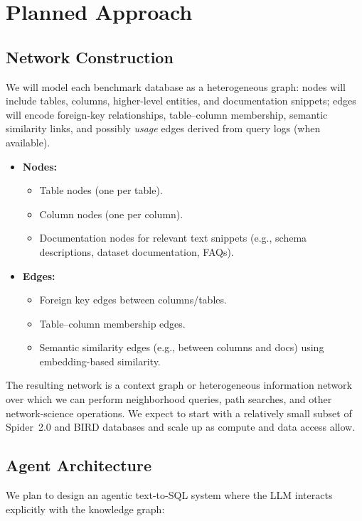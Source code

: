 \documentclass[11pt]{article}
\begin{document}
\section{Planned Approach}

\subsection{Network Construction}

We will model each benchmark database as a heterogeneous graph:
nodes will include tables, columns, higher-level entities, and documentation snippets;
edges will encode foreign-key relationships, table--column membership, semantic similarity links, and possibly \emph{usage} edges derived from query logs (when available).

\begin{itemize}[leftmargin=*]
  \item \textbf{Nodes:}
  \begin{itemize}
    \item Table nodes (one per table).
    \item Column nodes (one per column).
    \item Documentation nodes for relevant text snippets (e.g., schema descriptions, dataset documentation, FAQs).
  \end{itemize}
  \item \textbf{Edges:}
  \begin{itemize}
    \item Foreign key edges between columns/tables.
    \item Table--column membership edges.
    \item Semantic similarity edges (e.g., between columns and docs) using embedding-based similarity.
  \end{itemize}
\end{itemize}

The resulting network is a context graph or heterogeneous information network over which we can perform neighborhood queries, path searches, and other network-science operations.
We expect to start with a relatively small subset of Spider~2.0 and BIRD databases and scale up as compute and data access allow.

\subsection{Agent Architecture}

We plan to design an agentic text-to-SQL system where the LLM interacts explicitly with the knowledge graph:
\end{document}
